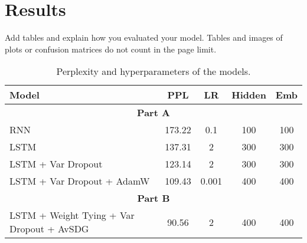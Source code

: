 \documentclass[a4paper]{article}
\begin{document}
\section{Results}
Add tables and explain how you evaluated your model. Tables and images of plots or confusion matrices do not count in the page limit.
\begin{table}[h!]
  \centering
  \begin{tabular}{lcccc}
      \midrule
      \textbf{Model} & \textbf{PPL} & \textbf{LR} & \textbf{Hidden} & \textbf{Emb} \\
      \midrule
      \multicolumn{5}{c}{\textbf{Part A}} \\
      RNN                     & 173.22 & 0.1    & 100 & 100 \\
      LSTM                    & 137.31 & 2      & 300 & 300 \\
      LSTM + Var Dropout      & 123.14 & 2      & 300 & 300 \\
      LSTM + Var Dropout + AdamW & 109.43 & 0.001 & 400 & 400 \\
      \midrule
      \multicolumn{5}{c}{\textbf{Part B}} \\
      \midrule
      LSTM + Weight Tying + Var Dropout + AvSDG & 90.56 & 2 & 400 & 400 \\
      \bottomrule
  \end{tabular}
  \caption{Perplexity and hyperparameters of the models.}
  \label{tab:results}
\end{table}





\end{document}
